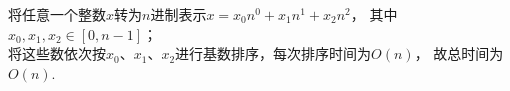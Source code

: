 \begin{solution}
将任意一个整数$x$转为$n$进制表示$x=x_0n^0+x_1n^1+x_2n^2$，
其中$x_0,x_1,x_2 \in [0,n-1]$；\\
将这些数依次按$x_0$、$x_1$、$x_2$进行基数排序，每次排序时间为$O(n)$，
故总时间为$O(n)$.
\end{solution}